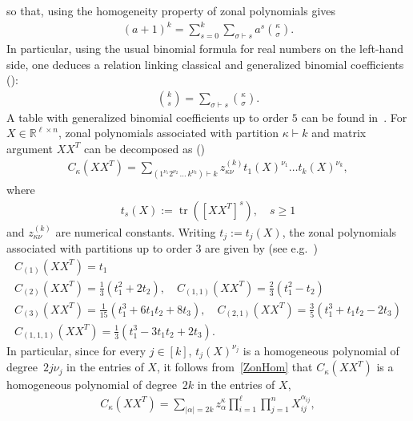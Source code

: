 \documentclass[10pt]{amsart}
\theoremstyle{definition}\newtheorem{defi}[theo]{Definition}\newtheorem{rema}[theo]{Remark}\newtheorem{exam}[theo]{Example}\newtheorem{exem}[theo]{Example}\newtheorem{nota}[theo]{Notation}
\DeclareMathOperator{\Tr}{tr}
\newcommand{\R}{\mathbb{R}}
\begin{document}
so that, using the homogeneity property of zonal polynomials gives
\begin{gather*}
(a+1)^{k} =
\sum_{s=0}^{k}
\sum_{\sigma \vdash s} a^s \binom{\kappa}{\sigma}.
\end{gather*}
In particular, using the usual binomial formula for real numbers on the left-hand side, one deduces a relation linking classical and generalized binomial coefficients (\cite[Eq.~(4.5.2)]{BFZP}):
\begin{gather*}
\binom{k}{s} = \sum_{\sigma \vdash s} \binom{\kappa}{\sigma}.
\end{gather*}
A table with generalized binomial coefficients up to order $5$ can be found in~\cite[Table~4.4.1]{BFZP}. For $X\in \R^{\ell\times n}$, zonal polynomials associated with partition $\kappa \vdash k$ and matrix argument $XX^T$ can be decomposed as (\cite[Theorem~4.3.6]{BFZP})
\begin{gather}\label{ZonHom}
C_{\kappa}(XX^T) = \sum_{\left(1^{\nu_1} 2^{\nu_2}\,\ldots\, k^{\nu_k}\right) \vdash k } z_{\kappa \nu}^{(k)} t_1(X)^{\nu_1}\ldots t_k(X)^{\nu_k},
\end{gather}
where
\begin{gather}\label{ts}
t_{s}(X) := \Tr{\left(\left[XX^T\right]^s\right)}, \quad s\geq 1
\end{gather}
and $z_{\kappa \nu}^{(k)}$ are numerical constants. Writing $t_j:=t_j(X)$, the zonal polynomials associated with partitions up to order $3$ are given by (see e.g.~\cite[Table~4.3.1]{BFZP})
\begin{gather*}
C_{(1)}\left(XX^T\right) = t_1 \\
C_{(2)}\left(XX^T\right) = \frac{1}{3}\left(t_1^2+2t_2\right), \quad C_{(1,1)}\left(XX^T\right) = \frac{2}{3}\left(t_1^2-t_2\right)\\
C_{(3)}\left(XX^T\right) = \frac{1}{15}\left(t_1^3+6t_1t_2+8t_3\right),\quad C_{(2,1)}\left(XX^T\right) = \frac{3}{5}\left(t_1^3+t_1t_2-2t_3\right) \\
C_{(1,1,1)}\left(XX^T\right) = \frac{1}{3}\left(t_1^3-3t_1t_2+2t_3\right).
\end{gather*}
In particular, since for every $j \in [k]$, $t_j(X)^{\nu_j}$ is a homogeneous polynomial of degree~$2j\nu_j$ in the entries of $X$, it follows from~\eqref{ZonHom} that $C_{\kappa}(XX^T)$ is a homogeneous polynomial of degree~$2k$ in the entries of $X$,
\begin{gather}\label{HOM}
C_{\kappa}\left(XX^T\right) = \sum_{|\alpha|=2k} z_{\alpha}^{\kappa} \prod_{i=1}^{\ell} \prod_{j=1}^n X_{ij}^{\alpha_{ij}},
\end{gather}
\end{document}
